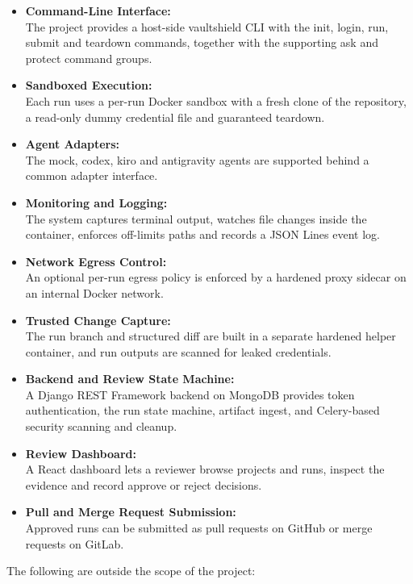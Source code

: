 \documentclass[12pt,a4paper,oneside]{report}
\begin{document}
\begin{itemize}
\item
  \textbf{Command-Line Interface:}\\
  The project provides a host-side vaultshield CLI with the init, login, run, submit and teardown commands, together with the supporting ask and protect command groups.
\item
  \textbf{Sandboxed Execution:}\\
  Each run uses a per-run Docker sandbox with a fresh clone of the repository, a read-only dummy credential file and guaranteed teardown.
\item
  \textbf{Agent Adapters:}\\
  The mock, codex, kiro and antigravity agents are supported behind a common adapter interface.
\item
  \textbf{Monitoring and Logging:}\\
  The system captures terminal output, watches file changes inside the container, enforces off-limits paths and records a JSON Lines event log.
\item
  \textbf{Network Egress Control:}\\
  An optional per-run egress policy is enforced by a hardened proxy sidecar on an internal Docker network.
\item
  \textbf{Trusted Change Capture:}\\
  The run branch and structured diff are built in a separate hardened helper container, and run outputs are scanned for leaked credentials.
\item
  \textbf{Backend and Review State Machine:}\\
  A Django REST Framework backend on MongoDB provides token authentication, the run state machine, artifact ingest, and Celery-based security scanning and cleanup.
\item
  \textbf{Review Dashboard:}\\
  A React dashboard lets a reviewer browse projects and runs, inspect the evidence and record approve or reject decisions.
\item
  \textbf{Pull and Merge Request Submission:}\\
  Approved runs can be submitted as pull requests on GitHub or merge requests on GitLab.
\end{itemize}

The following are outside the scope of the project:
\end{document}
